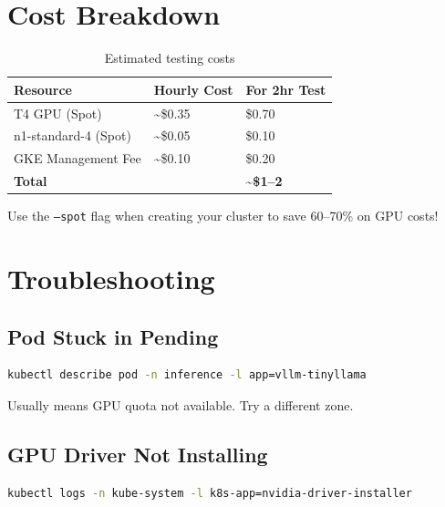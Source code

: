 \documentclass[11pt,a4paper]{article}
\begin{document}
\section{Cost Breakdown}

\begin{table}[h]
\centering
\begin{tabular}{@{}lll@{}}
\toprule
\textbf{Resource} & \textbf{Hourly Cost} & \textbf{For 2hr Test} \\
\midrule
T4 GPU (Spot) & \textasciitilde\$0.35 & \$0.70 \\
n1-standard-4 (Spot) & \textasciitilde\$0.05 & \$0.10 \\
GKE Management Fee & \textasciitilde\$0.10 & \$0.20 \\
\midrule
\textbf{Total} & & \textbf{\textasciitilde\$1--2} \\
\bottomrule
\end{tabular}
\caption{Estimated testing costs}
\end{table}

\begin{tcolorbox}[colback=tipblue,colframe=blue!50!black,title=\textbf{Pro Tip}]
Use the \texttt{--spot} flag when creating your cluster to save 60--70\% on GPU costs!
\end{tcolorbox}

\section{Troubleshooting}

\subsection{Pod Stuck in Pending}
\begin{lstlisting}[language=bash]
kubectl describe pod -n inference -l app=vllm-tinyllama
\end{lstlisting}
Usually means GPU quota not available. Try a different zone.

\subsection{GPU Driver Not Installing}
\begin{lstlisting}[language=bash]
kubectl logs -n kube-system -l k8s-app=nvidia-driver-installer
\end{lstlisting}
\end{document}
